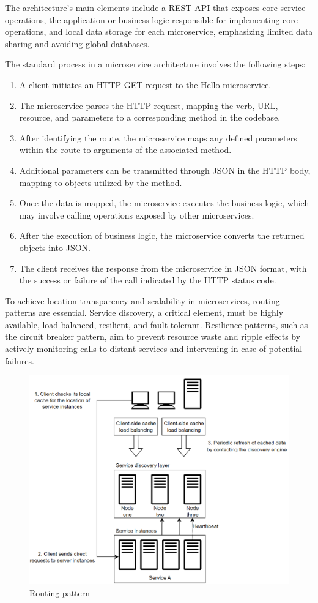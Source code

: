 The architecture's main elements include a REST API that exposes core service operations, the application or business logic responsible for implementing core operations, and local data storage for each microservice, emphasizing limited data sharing and avoiding global databases.

The standard process in a microservice architecture involves the following steps:
\begin{enumerate}
    \item A client initiates an HTTP GET request to the Hello microservice.
    \item The microservice parses the HTTP request, mapping the verb, URL, resource, and parameters to a corresponding method in the codebase.
    \item After identifying the route, the microservice maps any defined parameters within the route to arguments of the associated method.
    \item Additional parameters can be transmitted through JSON in the HTTP body, mapping to objects utilized by the method.
    \item Once the data is mapped, the microservice executes the business logic, which may involve calling operations exposed by other microservices.
    \item After the execution of business logic, the microservice converts the returned objects into JSON.
    \item The client receives the response from the microservice in JSON format, with the success or failure of the call indicated by the HTTP status code.
\end{enumerate}

To achieve location transparency and scalability in microservices, routing patterns are essential.
Service discovery, a critical element, must be highly available, load-balanced, resilient, and fault-tolerant. 
Resilience patterns, such as the circuit breaker pattern, aim to prevent resource waste and ripple effects by actively monitoring calls to distant services and intervening in case of potential failures.
\begin{figure}[H]
    \centering
    \includegraphics[width=0.75\linewidth]{images/rp.png}
    \caption{Routing pattern}
\end{figure}

